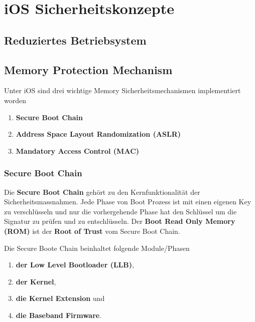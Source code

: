 %
%
% 
% 
% 
\chapter{iOS Sicherheitskonzepte}
\label{ch:iOSSicherheitsKonzepte}
\section{Reduziertes Betriebsystem}
\label{sec:reduziertesOS}

\section{Memory Protection Mechanism}
\label{sec:MemoryProtection}
Unter iOS sind drei wichtige Memory Sicherheitsmechanismen implementiert worden
\begin{enumerate}
    \item \textbf{Secure Boot Chain}
    \item \textbf{Address Space Layout Randomization (ASLR)}
    \item \textbf{Mandatory Access Control (MAC)}
\end{enumerate}

\subsection{Secure Boot Chain}
\label{sec:SecBootChain}

Die \textbf{Secure Boot Chain} gehört zu den Kernfunktionalität der Sicherheitsmassnahmen. Jede Phase von Boot Prozess ist mit einen eigenen Key zu verschlüsseln und nur die vorhergehende Phase hat den Schlüssel um die Signatur zu prüfen und zu entschlüsseln. Der  \textbf{Boot Read Only Memory (ROM)} ist der \textbf{Root of Trust} vom Secure Boot Chain. \cite{Apple[4], Apple[5], Apple[6]}
 
Die Secure Boote Chain beinhaltet folgende Module/Phasen
\begin{enumerate}
   \item \textbf{der Low Level Bootloader (LLB)},
   \item \textbf{der Kernel},
   \item \textbf{die Kernel Extension} und
   \item \textbf{die Baseband Firmware}.
\end{enumerate}

